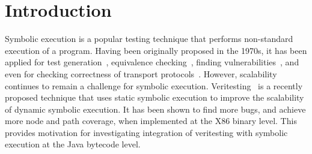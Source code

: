 \section{Introduction}
Symbolic execution is a popular testing technique that performs non-standard execution of a program.
%
Having been originally proposed in the 1970s, it has been applied for test generation~\cite{dart,cute}, equivalence checking~\cite{ramos,adaptorsynth}, finding vulnerabilities~\cite{driller,angr}, and even for checking correctness of transport protocols~\cite{transport}.
%
However, scalability continues to remain a challenge for symbolic execution.
%
Veritesting~\cite{veritesting} is a recently proposed technique that uses static symbolic execution to improve the scalability of dynamic symbolic execution.
%
It has been shown to find more bugs, and achieve more node and path coverage, when implemented at the X86 binary level.
%
This provides motivation for investigating integration of veritesting with symbolic execution at the Java bytecode level.



